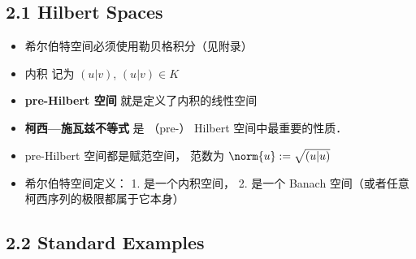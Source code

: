 
\subsection{2.1 Hilbert Spaces}
\begin{itemize}
\item 希尔伯特空间必须使用勒贝格积分（见附录）

\item 内积 记为 $(u|v)$, $(u|v) \in K$

\item \textbf{pre-Hilbert 空间}  就是定义了内积的线性空间

\item \textbf{柯西—施瓦兹不等式} 是 （pre-） Hilbert 空间中最重要的性质．

\item pre-Hilbert 空间都是赋范空间， 范数为 $\norm{u} := \sqrt{(u|u)}$

\item 希尔伯特空间定义： 1. 是一个内积空间， 2. 是一个 Banach 空间（或者任意柯西序列的极限都属于它本身）

\end{itemize}

\subsection{2.2 Standard Examples}

